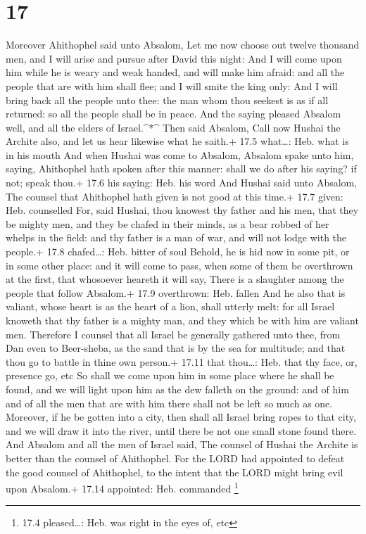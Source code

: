 \hypertarget{section-16}{%
\section{17}\label{section-16}}

 Moreover Ahithophel said unto Absalom, Let me now choose
out twelve thousand men, and I will arise and pursue after David this
night:  And I will come upon him while he is weary and weak
handed, and will make him afraid: and all the people that are with him
shall flee; and I will smite the king only:  And I will
bring back all the people unto thee: the man whom thou seekest is as if
all returned: so all the people shall be in peace.  And the
saying pleased Absalom well, and all the elders of Israel.\^{}*\^{}
 Then said Absalom, Call now Hushai the Archite also, and
let us hear likewise what he saith.+ 17.5 what\ldots: Heb. what is in
his mouth  And when Hushai was come to Absalom, Absalom
spake unto him, saying, Ahithophel hath spoken after this manner: shall
we do after his saying? if not; speak thou.+ 17.6 his saying: Heb. his
word  And Hushai said unto Absalom, The counsel that
Ahithophel hath given is not good at this time.+ 17.7 given: Heb.
counselled  For, said Hushai, thou knowest thy father and
his men, that they be mighty men, and they be chafed in their minds, as
a bear robbed of her whelps in the field: and thy father is a man of
war, and will not lodge with the people.+ 17.8 chafed\ldots: Heb. bitter
of soul  Behold, he is hid now in some pit, or in some other
place: and it will come to pass, when some of them be overthrown at the
first, that whosoever heareth it will say, There is a slaughter among
the people that follow Absalom.+ 17.9 overthrown: Heb. fallen
 And he also that is valiant, whose heart is as the heart
of a lion, shall utterly melt: for all Israel knoweth that thy father is
a mighty man, and they which be with him are valiant men. 
Therefore I counsel that all Israel be generally gathered unto thee,
from Dan even to Beer-sheba, as the sand that is by the sea for
multitude; and that thou go to battle in thine own person.+ 17.11 that
thou\ldots: Heb. that thy face, or, presence go, etc  So
shall we come upon him in some place where he shall be found, and we
will light upon him as the dew falleth on the ground: and of him and of
all the men that are with him there shall not be left so much as one.
 Moreover, if he be gotten into a city, then shall all
Israel bring ropes to that city, and we will draw it into the river,
until there be not one small stone found there.  And
Absalom and all the men of Israel said, The counsel of Hushai the
Archite is better than the counsel of Ahithophel. For the LORD had
appointed to defeat the good counsel of Ahithophel, to the intent that
the LORD might bring evil upon Absalom.+ 17.14 appointed: Heb. commanded
\footnote{17.4 pleased\ldots: Heb. was right in the eyes of, etc}

